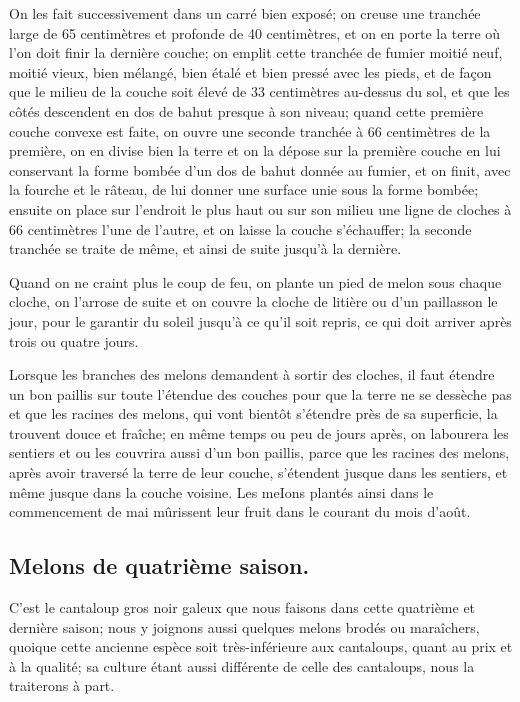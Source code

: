 \documentclass[10pt,a4paper]{book}
\begin{document}
On les fait successivement dans un carré bien exposé; on creuse une tranchée large de 65 centimètres et profonde de 40 centimètres, et on en porte la terre où l'on doit finir la dernière couche; on emplit cette tranchée de fumier moitié neuf, moitié vieux, bien mélangé, bien étalé et bien pressé avec les pieds, et de façon que le milieu de la couche soit élevé de 33 centimètres au-dessus du sol, et que les côtés descendent en dos de bahut presque à son niveau; quand cette première couche convexe est faite, on ouvre une seconde tranchée à 66 centimètres de la première, on en divise bien la terre et on la dépose sur la première couche en lui conservant la forme bombée d'un dos de bahut donnée au fumier, et on finit, avec la fourche et le râteau, de lui donner une surface unie sous la forme bombée; ensuite on place sur l'endroit le plus haut ou sur son milieu une ligne de cloches à 66 centimètres l'une de l'autre, et on laisse la couche s'échauffer; la seconde tranchée se traite de même, et ainsi de suite jusqu'à la dernière.

Quand on ne craint plus le coup de feu, on plante un pied de melon sous chaque cloche, on l'arrose de suite et on couvre la cloche de litière ou d'un paillasson le jour, pour le garantir du soleil jusqu'à ce qu'il soit repris, ce qui doit arriver après trois ou quatre jours.

Lorsque les branches des melons demandent à sortir des cloches, il faut étendre un bon paillis sur toute l'étendue des couches pour que la terre ne se dessèche pas et que les racines des melons, qui vont bientôt s'étendre près de sa superficie, la trouvent douce et fraîche; en même temps ou peu de jours après, on labourera les sentiers et ou les couvrira aussi d'un bon paillis, parce que les racines des melons, après avoir traversé la terre de leur couche, s'étendent jusque dans les sentiers, et même jusque dans la couche voisine. Les meIons plantés ainsi dans le commencement de mai mûrissent leur fruit dans le courant du mois d'août.

\subsection{Melons de quatrième saison.}

C'est le cantaloup gros noir galeux que nous faisons dans cette quatrième et dernière saison; nous y joignons aussi quelques melons brodés ou maraîchers, quoique cette ancienne espèce soit très-inférieure aux cantaloups, quant au prix et à la qualité; sa culture étant aussi différente de celle des cantaloups, nous la traiterons à part.
\end{document}
